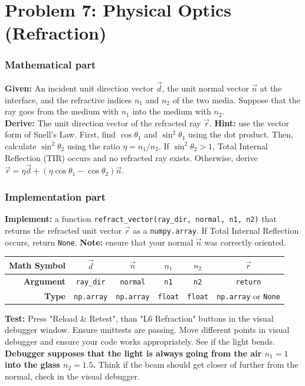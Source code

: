 \documentclass[11pt]{article}
\begin{document}
\section*{Problem 7: Physical Optics (Refraction)}

\subsubsection*{Mathematical part}
\textbf{Given:} An incident unit direction vector $\vec{d}$, the unit normal vector $\vec{n}$ at the interface, and the refractive indices $n_1$ and $n_2$ of the two media. Suppose that the ray goes from the medium with $n_1$ into the medium with $n_2$. \\
\textbf{Derive:} The unit direction vector of the refracted ray $\vec{r}$. \textbf{Hint:} use the vector form of Snell's Law. First, find $\cos \theta_1$ and $\sin^2 \theta_1$ using the dot product. Then, calculate $\sin^2 \theta_2$ using the ratio $\eta = n_1/n_2$. If $\sin^2 \theta_2 > 1$, Total Internal Reflection (TIR) occurs and no refracted ray exists. Otherwise, derive $\vec{r} = \eta \vec{d} + (\eta \cos \theta_1 - \cos \theta_2)\vec{n}$.

\subsubsection*{Implementation part}
\textbf{Implement:} a function \lstinline|refract_vector(ray_dir, normal, n1, n2)| that returns the refracted unit vector $\vec{r}$ as a \lstinline|numpy.array|. If Total Internal Reflection occurs, return \lstinline|None|. \textbf{Note:} ensure that your normal $\vec{n}$ was correctly oriented.
\begin{center}
\renewcommand{\arraystretch}{2.0}
\begin{tabular}{r | c | c | c | c | c}
\toprule
\textbf{Math Symbol} & $\vec{d}$ & $\vec{n}$ & $n_1$ & $n_2$ & $\vec{r}$ \\
\midrule
\textbf{Argument} & \lstinline|ray_dir| & \lstinline|normal| & \lstinline|n1| & \lstinline|n2| & \lstinline|return| \\
\midrule
\textbf{Type} & \lstinline|np.array| & \lstinline|np.array| & \lstinline|float| & \lstinline|float| & \lstinline|np.array| or \lstinline|None| \\
\bottomrule
\end{tabular}
\end{center}
\textbf{Test:} Press "Reload \& Retest", than "L6 Refraction" buttons in the visual debugger window. Ensure unittests are passing. Move different points in visual debugger and ensure your code works appropriately. See if the light bends. \textbf{Debugger supposes that the light is always going from the air $n_1 = 1$ into the glass $n_2 = 1.5$.} Think if the beam should get closer of further from the normal, check in the visual debugger.
\end{document}
